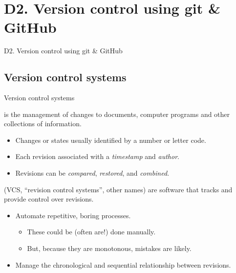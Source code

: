 \documentclass[12pt,aspectratio=169]{beamer}
\begin{document}
\section{D2. Version control using git \& GitHub}
\begin{frame}{D2. Version control using git \& GitHub}
\tableofcontents[hideothersubsections]
\end{frame}

\subsection{Version control systems}
\begin{frame}{Version control systems}

 is the management of changes to documents, computer programs and other collections of information.

\begin{itemize}
  \item Changes or states usually identified by a number or letter code.
  \item Each revision associated with a \emph{timestamp} and \emph{author}.
  \item Revisions can be \emph{compared}, \emph{restored}, and \emph{combined}.
\end{itemize}

\bigskip
{} (VCS, “revision control systems”, other names) are software that tracks and provide control over revisions.

\begin{itemize}
  \item Automate repetitive, boring processes.
    \begin{itemize}
      \item These could be (often are!) done manually.
      \item But, because they are monotonous, mistakes are likely.
    \end{itemize}
  \item Manage the chronological and sequential relationship between revisions.
\end{itemize}

\end{frame}
\end{document}
